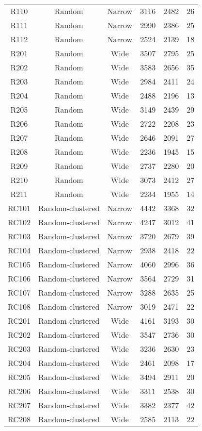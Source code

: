 \begin{table}[t]
\begin{tabular*}{0.8\linewidth}{@{\extracolsep{\fill}}cccccc}
R110 & Random & Narrow & 3116 & 2482 & 26\\
R111 & Random & Narrow & 2990 & 2386 & 25\\
R112 & Random & Narrow & 2524 & 2139 & 18\\
R201 & Random & Wide & 3507 & 2795 & 25\\
R202 & Random & Wide & 3583 & 2656 & 35\\
R203 & Random & Wide & 2984 & 2411 & 24\\
R204 & Random & Wide & 2488 & 2196 & 13\\
R205 & Random & Wide & 3149 & 2439 & 29\\
R206 & Random & Wide & 2722 & 2208 & 23\\
R207 & Random & Wide & 2646 & 2091 & 27\\
R208 & Random & Wide & 2236 & 1945 & 15\\
R209 & Random & Wide & 2737 & 2280 & 20\\
R210 & Random & Wide & 3073 & 2412 & 27\\
R211 & Random & Wide & 2234 & 1955 & 14\\
RC101 & Random-clustered & Narrow & 4442 & 3368 & 32\\
RC102 & Random-clustered & Narrow & 4247 & 3012 & 41\\
RC103 & Random-clustered & Narrow & 3720 & 2679 & 39\\
RC104 & Random-clustered & Narrow & 2938 & 2418 & 22\\
RC105 & Random-clustered & Narrow & 4060 & 2996 & 36\\
RC106 & Random-clustered & Narrow & 3564 & 2729 & 31\\
RC107 & Random-clustered & Narrow & 3288 & 2635 & 25\\
RC108 & Random-clustered & Narrow & 3019 & 2471 & 22\\
RC201 & Random-clustered & Wide & 4161 & 3193 & 30\\
RC202 & Random-clustered & Wide & 3547 & 2736 & 30\\
RC203 & Random-clustered & Wide & 3236 & 2630 & 23\\
RC204 & Random-clustered & Wide & 2461 & 2098 & 17\\
RC205 & Random-clustered & Wide & 3494 & 2911 & 20\\
RC206 & Random-clustered & Wide & 3311 & 2538 & 30\\
RC207 & Random-clustered & Wide & 3382 & 2377 & 42\\
RC208 & Random-clustered & Wide & 2585 & 2113 & 22\\
\end{tabular*}\end{table}